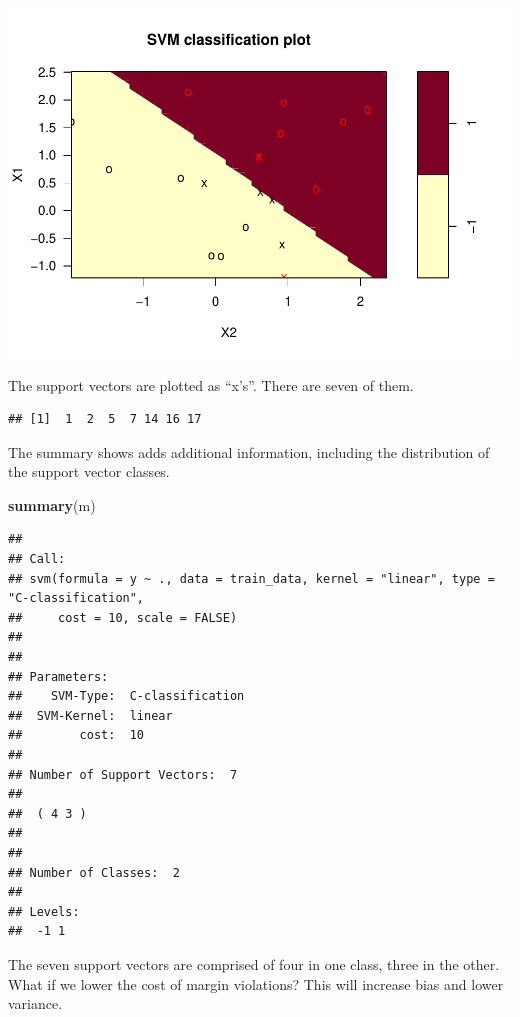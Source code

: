 \documentclass[
]{book}
\newenvironment{Shaded}{\begin{snugshade}}{\end{snugshade}}
\newcommand{\KeywordTok}[1]{\textcolor[rgb]{0.13,0.29,0.53}{\textbf{#1}}}
\newcommand{\NormalTok}[1]{#1}
\newcommand{\OperatorTok}[1]{\textcolor[rgb]{0.81,0.36,0.00}{\textbf{#1}}}
\begin{document}
\includegraphics{data-sci_files/figure-latex/unnamed-chunk-129-1.pdf}

The support vectors are plotted as ``x's''. There are seven of them.

\begin{Shaded}
\end{Shaded}

\begin{verbatim}
## [1]  1  2  5  7 14 16 17
\end{verbatim}

The summary shows adds additional information, including the distribution of the support vector classes.

\begin{Shaded}
\begin{Highlighting}[]
\KeywordTok{summary}\NormalTok{(m)}
\end{Highlighting}
\end{Shaded}

\begin{verbatim}
## 
## Call:
## svm(formula = y ~ ., data = train_data, kernel = "linear", type = "C-classification", 
##     cost = 10, scale = FALSE)
## 
## 
## Parameters:
##    SVM-Type:  C-classification 
##  SVM-Kernel:  linear 
##        cost:  10 
## 
## Number of Support Vectors:  7
## 
##  ( 4 3 )
## 
## 
## Number of Classes:  2 
## 
## Levels: 
##  -1 1
\end{verbatim}

The seven support vectors are comprised of four in one class, three in the other. What if we lower the cost of margin violations? This will increase bias and lower variance.
\end{document}
